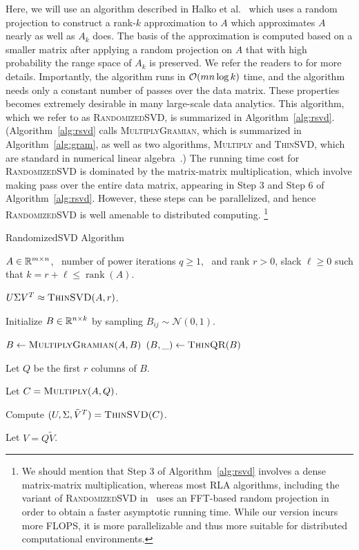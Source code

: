 Here, we will use an algorithm described in Halko et al.~\cite{HMT09_SIREV} which uses a random projection to construct a rank-$k$ approximation to $A$ which approximates $A$ nearly as well as $A_k$ does.
The basis of the approximation is computed based on a smaller matrix after applying a random projection on $A$ that with high probability the range space of $A_k$ is preserved. We refer the readers to \cite{HMT09_SIREV,Mah-mat-rev_BOOK} for more details.
Importantly, the algorithm runs in $\operatorname{\mathcal{O}}(mn \log k)$ time, and the algorithm needs only a constant number of passes over the data matrix. 
These properties becomes extremely desirable in many large-scale data analytics. 
This algorithm, which we refer to as \textsc{RandomizedSVD}, is summarized in Algorithm~\ref{alg:rsvd}.
(Algorithm~\ref{alg:rsvd} calls \textsc{MultiplyGramian}, which is summarized in Algorithm~\ref{alg:gram}, as well as two algorithms, \textsc{Multiply} and \textsc{ThinSVD}, which are standard in numerical linear algebra~\cite{GVL96}.) 
The running time cost for \textsc{RandomizedSVD} is dominated by the matrix-matrix multiplication, which involve making pass over the entire data matrix, appearing in Step 3 and Step 6 of Algorithm~\ref{alg:rsvd}.
However, these steps can be parallelized, and hence \textsc{RandomizedSVD} is well amenable to distributed computing.%
\footnote{We should mention that Step 3 of Algorithm~\ref{alg:rsvd} involves a dense matrix-matrix multiplication, whereas most RLA algorithms, including the variant of \textsc{RandomizedSVD} in~\cite{HMT09_SIREV} uses an FFT-based random projection in order to obtain a faster asymptotic running time.  While our version incurs more FLOPS, it is more parallelizable and thus more suitable for distributed computational environments.}


\begin{algorithm}[tb]
 \caption{{\sc RandomizedSVD} Algorithm}
  \label{alg:rsvd}
  \begin{algorithmic}[1]
    \Require $A \in \mathbb{R}^{m\times n}$, \
      number of power iterations $q \ge 1$, \
      and rank $r > 0$, slack $\ell \ge 0$ such that $k=r+\ell \leq \operatorname{rank}(A)$.

    \Ensure $U \Sigma V^T \approx \Call{ThinSVD}{A, r}$.

    \State Initialize $B \in \mathbb{R}^{n\times k}$ by sampling $B_{ij} \sim \mathcal{N}(0, 1)$.

    \For{$q$ times}
        \State $B \gets \Call{MultiplyGramian}{A, B}$
        \State $(B, \_) \gets \Call{ThinQR}{B}$
    \EndFor

    \State Let $Q$ be the first $r$ columns of $B$.

    \State Let $C = \Call{Multiply}{A, Q}$.

    \State Compute $(U, \Sigma, \tilde V^T) = \Call{ThinSVD}{C}$.

    \State Let $V = Q \tilde V$.

    \end{algorithmic}
\end{algorithm}

